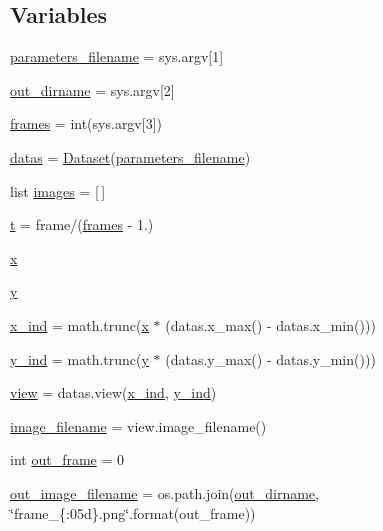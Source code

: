 \subsection*{Variables}
\begin{DoxyCompactItemize}
\item 
\hyperlink{namespaceextract__parametric_a0eb7a97525953d846466d58d2a35175b}{parameters\+\_\+filename} = sys.\+argv\mbox{[}1\mbox{]}
\item 
\hyperlink{namespaceextract__parametric_adf9a3c8f1bd35b8eaa0aab6093f1d2ef}{out\+\_\+dirname} = sys.\+argv\mbox{[}2\mbox{]}
\item 
\hyperlink{namespaceextract__parametric_ab661bcbac8504f589b9ee4d6ee638a6d}{frames} = int(sys.\+argv\mbox{[}3\mbox{]})
\item 
\hyperlink{namespaceextract__parametric_a80f2e013a61bda4d25d8f744afa104ff}{datas} = \hyperlink{classpylib_1_1dataset_1_1Dataset}{Dataset}(\hyperlink{namespaceextract__parametric_a0eb7a97525953d846466d58d2a35175b}{parameters\+\_\+filename})
\item 
list \hyperlink{namespaceextract__parametric_a04c0fe150206be8c6736ad9452783f23}{images} = \mbox{[}$\,$\mbox{]}
\item 
\hyperlink{namespaceextract__parametric_a730b851f64e77467557fbc820239405a}{t} = frame/(\hyperlink{namespaceextract__parametric_ab661bcbac8504f589b9ee4d6ee638a6d}{frames} -\/ 1.)
\item 
\hyperlink{namespaceextract__parametric_ab6f1cb05726babc5a8a23423bb0771ea}{x}
\item 
\hyperlink{namespaceextract__parametric_a44dd9ad3fb87f7ac87bf947c21ccda51}{y}
\item 
\hyperlink{namespaceextract__parametric_a635ed12295f3ed674897db057b560da2}{x\+\_\+ind} = math.\+trunc(\hyperlink{namespaceextract__parametric_ab6f1cb05726babc5a8a23423bb0771ea}{x} $\ast$ (datas.\+x\+\_\+max() -\/ datas.\+x\+\_\+min()))
\item 
\hyperlink{namespaceextract__parametric_a4b52673e12fe50f676553f4375dbd97a}{y\+\_\+ind} = math.\+trunc(\hyperlink{namespaceextract__parametric_a44dd9ad3fb87f7ac87bf947c21ccda51}{y} $\ast$ (datas.\+y\+\_\+max() -\/ datas.\+y\+\_\+min()))
\item 
\hyperlink{namespaceextract__parametric_a71563aa31bfb99f2393aeadc66797e54}{view} = datas.\+view(\hyperlink{namespaceextract__parametric_a635ed12295f3ed674897db057b560da2}{x\+\_\+ind}, \hyperlink{namespaceextract__parametric_a4b52673e12fe50f676553f4375dbd97a}{y\+\_\+ind})
\item 
\hyperlink{namespaceextract__parametric_ab9475a5f123365a5a868b9481e87d163}{image\+\_\+filename} = view.\+image\+\_\+filename()
\item 
int \hyperlink{namespaceextract__parametric_a073b7ebc2ff68e243f2c5ea8b1c6061d}{out\+\_\+frame} = 0
\item 
\hyperlink{namespaceextract__parametric_a65e8dff0853e3524cad91838fcc80520}{out\+\_\+image\+\_\+filename} = os.\+path.\+join(\hyperlink{namespaceextract__parametric_adf9a3c8f1bd35b8eaa0aab6093f1d2ef}{out\+\_\+dirname}, \char`\"{}frame\+\_\+\{\+:05d\}.\+png\char`\"{}.\+format(out\+\_\+frame))
\end{DoxyCompactItemize}



